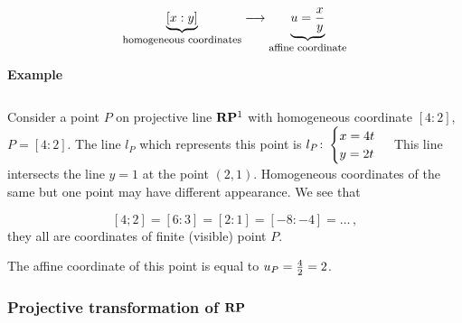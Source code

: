 \documentclass[12pt]{article}
\numberwithin{equation}{section}
\begin{document}
       \begin{equation*}
        \begin{matrix}
  \underbrace{ [x:y]}_{\hbox {\footnotesize homogeneous coordinates}} 
      \longrightarrow  
\underbrace{u={x\over y}}_{\hbox{\footnotesize affine coordinate}}\cr
       \end{matrix}
      \end{equation*}

\smallskip

{\bf Example}

    \begin{equation*}
     \end{equation*} 


Consider a point $P$ on projective line ${\bf R}{\bf P}^1$
with homogeneous coordinate $[4:2]$,
$P=[4:2]$.   The line $l_P$ which represents this point
is 
$l_P\colon 
\begin{cases} x=4t\cr y=2t\cr\end{cases}$
This line intersects the line $y=1$ at the point
$(2,1)$. Homogeneous coordinates of the same but one point 
may have different appearance. We see that 

          $$
[4;2]=[6:3]=[2:1]=[-8:-4]=\dots\,,
         $$
they all are coordinates of finite (visible) point
   $P$.

The affine coordinate of this point is equal to
  $u_P={4\over 2}=2$. 



\subsubsection {Projective transformation of ${\bf R}{\bf P}$}

\end{document}
